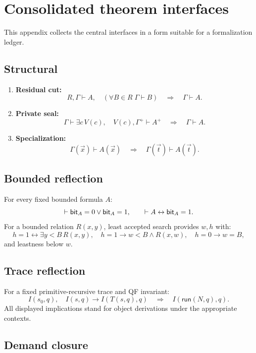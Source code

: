 \appendix
\section{Consolidated theorem interfaces}

This appendix collects the central interfaces in a form suitable for a formalization ledger.

\subsection{Structural}

\begin{enumerate}
\item \textbf{Residual cut:}
\[
R,\Gamma\vdash A,
\quad (\forall B\in R\;\Gamma\vdash B)
\quad\Longrightarrow\quad
\Gamma\vdash A.
\]
\item \textbf{Private seal:}
\[
\Gamma\vdash\exists c\,V(c),
\quad V(c),\Gamma^+\vdash A^+
\quad\Longrightarrow\quad
\Gamma\vdash A.
\]
\item \textbf{Specialization:}
\[
\Gamma(\vec x)\vdash A(\vec x)
\quad\Longrightarrow\quad
\Gamma(\vec t)\vdash A(\vec t).
\]
\end{enumerate}

\subsection{Bounded reflection}

For every fixed bounded formula \(A\):
\[
\vdash \mathsf{bit}_A=0\vee\mathsf{bit}_A=1,
\qquad
\vdash A\leftrightarrow\mathsf{bit}_A=1.
\]
For a bounded relation \(R(x,y)\), least accepted search provides \(w,h\) with:
\[
 h=1\leftrightarrow\exists y<B\,R(x,y),
\quad h=1\to w<B\wedge R(x,w),
\quad h=0\to w=B,
\]
and leastness below \(w\).

\subsection{Trace reflection}

For a fixed primitive-recursive trace and QF invariant:
\[
I(s_0,q),
\quad I(s,q)\to I(T(s,q),q)
\quad\Longrightarrow\quad
I(\mathsf{run}(N,q),q).
\]
All displayed implications stand for object derivations under the appropriate contexts.

\subsection{Demand closure}

